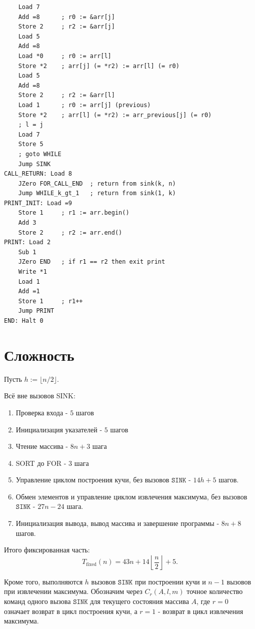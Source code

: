 \documentclass[12pt]{article}
\begin{document}
\begin{verbatim}
    Load 7
    Add =8      ; r0 := &arr[j]
    Store 2     ; r2 := &arr[j]
    Load 5
    Add =8
    Load *0     ; r0 := arr[l]
    Store *2    ; arr[j] (= *r2) := arr[l] (= r0)
    Load 5
    Add =8
    Store 2     ; r2 := &arr[l]
    Load 1      ; r0 := arr[j] (previous)
    Store *2    ; arr[l] (= *r2) := arr_previous[j] (= r0)
    ; l = j
    Load 7
    Store 5
    ; goto WHILE
    Jump SINK
CALL_RETURN: Load 8
    JZero FOR_CALL_END  ; return from sink(k, n)
    Jump WHILE_k_gt_1   ; return from sink(1, k)
PRINT_INIT: Load =9
    Store 1     ; r1 := arr.begin()
    Add 3
    Store 2     ; r2 := arr.end()
PRINT: Load 2
    Sub 1
    JZero END   ; if r1 == r2 then exit print
    Write *1
    Load 1
    Add =1
    Store 1     ; r1++
    Jump PRINT
END: Halt 0
\end{verbatim}

\section{Сложность}

Пусть $h:=\lfloor n/2\rfloor$.

Всё вне вызовов SINK:
\begin{enumerate}
    \item Проверка входа - $5$ шагов
    \item Инициализация указателей - $5$ шагов
    \item Чтение массива - $8n+3$ шага
    \item SORT до FOR - $3$ шага
    \item Управление циклом построения кучи, без вызовов $\texttt{SINK}$ - $14h+5$ шагов.
    \item Обмен элементов и управление циклом извлечения максимума, без вызовов $\texttt{SINK}$ - $27n-24$ шага.
    \item Инициализация вывода, вывод массива и завершение программы - $8n+8$ шагов.
\end{enumerate}

Итого фиксированная часть:
\[
    T_{\mathrm{fixed}}(n)=43n+14\left\lfloor\frac n2\right\rfloor+5.
\]

Кроме того, выполняются $h$ вызовов $\texttt{SINK}$ при построении кучи и $n-1$ вызовов при извлечении максимума. Обозначим через $C_r(A,l,m)$ точное количество команд одного вызова $\texttt{SINK}$ для текущего состояния массива $A$, где $r=0$ означает возврат в цикл построения кучи, а $r=1$ - возврат в цикл извлечения максимума.
\end{document}
